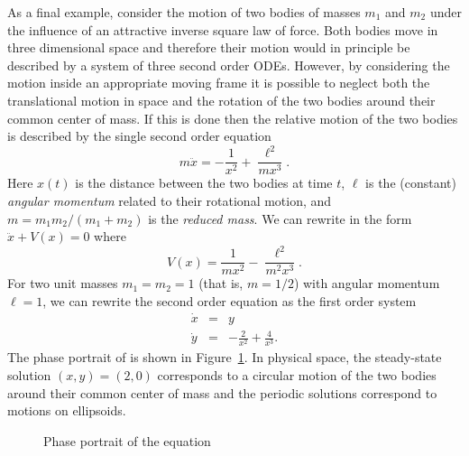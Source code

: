 \documentclass{ximera}
\begin{document}
As a final example, consider the motion of two bodies of masses $m_1$ and 
$m_2$ under the influence of an attractive inverse square law of force.  Both 
bodies move in three dimensional space and therefore their motion would in 
principle be described by a system of three second order ODEs. However, by 
considering the motion inside an appropriate moving frame it is possible to 
neglect both the translational motion in space and the rotation of the two 
bodies around their common center of mass.  If this is done then the relative 
motion of the two bodies is described by the single second order equation
\begin{equation} \label{E:2body}
m\ddot x = -\frac{1}{x^2} + \frac{\ell^2}{mx^3}.
\end{equation}
Here $x(t)$ is the distance between the two bodies at time $t$,  $\ell$ is 
the (constant) {\em angular momentum\/} related to their rotational motion, 
and $m=m_1 m_2/(m_1 + m_2)$ is the {\em reduced mass}. 
We can rewrite  in the form $\ddot{x}+V(x)=0$ where
\[
V(x) =  \frac{1}{mx^2} - \frac{\ell^2}{m^2x^3}.
\]
For two unit masses $m_1=m_2=1$ (that is, $m=1/2$) with angular momentum 
$\ell = 1$, we can rewrite the second order equation as the first order system 
\begin{equation*} \label{e:tbp}
\begin{array}{rcl}
\dot{x} & = & y \\
\dot{y} & = & -\frac{2}{x^2} + \frac{4}{x^3}.
\end{array}
\end{equation*}
The phase portrait of  is shown in Figure~\ref{fig:tbp}.  In 
physical space, the steady-state solution $(x,y)=(2,0)$ corresponds to a 
circular motion of the two bodies around their common center of mass and 
the periodic solutions correspond to motions on ellipsoids.

\begin{figure}[htb]
           \centerline{%
           }
           \caption{Phase portrait of the equation
                \protect{}}
           \label{fig:tbp}
\end{figure}



\EXER

\TEXER

\end{document}
